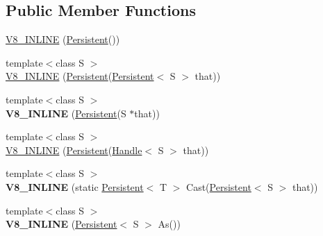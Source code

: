 \subsection*{Public Member Functions}
\begin{DoxyCompactItemize}
\item 
\hyperlink{classv8_1_1_persistent_ad523a6fc8bf2490020009436519423d0}{V8\+\_\+\+I\+N\+L\+I\+N\+E} (\hyperlink{classv8_1_1_persistent}{Persistent}())
\item 
{\footnotesize template$<$class S $>$ }\\\hyperlink{classv8_1_1_persistent_a22ac4d575e808ed10b6504dc8f812789}{V8\+\_\+\+I\+N\+L\+I\+N\+E} (\hyperlink{classv8_1_1_persistent}{Persistent}(\hyperlink{classv8_1_1_persistent}{Persistent}$<$ S $>$ that))
\item 
\hypertarget{classv8_1_1_persistent_a59285008a6fcdd9a5189015403375b4e}{}{\footnotesize template$<$class S $>$ }\\{\bfseries V8\+\_\+\+I\+N\+L\+I\+N\+E} (\hyperlink{classv8_1_1_persistent}{Persistent}(S $\ast$that))\label{classv8_1_1_persistent_a59285008a6fcdd9a5189015403375b4e}

\item 
{\footnotesize template$<$class S $>$ }\\\hyperlink{classv8_1_1_persistent_aabe20913d6860e124574bc4d67535a5c}{V8\+\_\+\+I\+N\+L\+I\+N\+E} (\hyperlink{classv8_1_1_persistent}{Persistent}(\hyperlink{classv8_1_1_handle}{Handle}$<$ S $>$ that))
\item 
\hypertarget{classv8_1_1_persistent_acd5e8f1e94848aff791b9bdf0f1fed90}{}{\footnotesize template$<$class S $>$ }\\{\bfseries V8\+\_\+\+I\+N\+L\+I\+N\+E} (static \hyperlink{classv8_1_1_persistent}{Persistent}$<$ T $>$ Cast(\hyperlink{classv8_1_1_persistent}{Persistent}$<$ S $>$ that))\label{classv8_1_1_persistent_acd5e8f1e94848aff791b9bdf0f1fed90}

\item 
\hypertarget{classv8_1_1_persistent_a092bc149b5515c88e5950717e90eed9f}{}{\footnotesize template$<$class S $>$ }\\{\bfseries V8\+\_\+\+I\+N\+L\+I\+N\+E} (\hyperlink{classv8_1_1_persistent}{Persistent}$<$ S $>$ As())\label{classv8_1_1_persistent_a092bc149b5515c88e5950717e90eed9f}


\end{DoxyCompactItemize}
